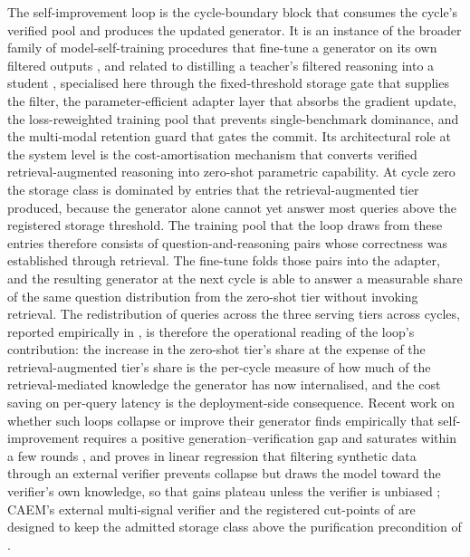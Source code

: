 The self-improvement loop is the cycle-boundary block that consumes the cycle's verified pool and produces the updated generator. It is an instance of the broader family of model-self-training procedures that fine-tune a generator on its own filtered outputs \cite{NEURIPS2022_639a9a17,hosseini2024vstar,gulcehre2023rest}, and related to distilling a teacher's filtered reasoning into a student \cite{ho2023large}, specialised here through the fixed-threshold storage gate that supplies the filter, the parameter-efficient adapter layer that absorbs the gradient update, the loss-reweighted training pool that prevents single-benchmark dominance, and the multi-modal retention guard that gates the commit. Its architectural role at the system level is the cost-amortisation mechanism that converts verified retrieval-augmented reasoning into zero-shot parametric capability. At cycle zero the storage class is dominated by entries that the retrieval-augmented tier produced, because the generator alone cannot yet answer most queries above the registered storage threshold. The training pool that the loop draws from these entries therefore consists of question-and-reasoning pairs whose correctness was established through retrieval. The fine-tune folds those pairs into the adapter, and the resulting generator at the next cycle is able to answer a measurable share of the same question distribution from the zero-shot tier without invoking retrieval. The redistribution of queries across the three serving tiers across cycles, reported empirically in , is therefore the operational reading of the loop's contribution: the increase in the zero-shot tier's share at the expense of the retrieval-augmented tier's share is the per-cycle measure of how much of the retrieval-mediated knowledge the generator has now internalised, and the cost saving on per-query latency is the deployment-side consequence. Recent work on whether such loops collapse or improve their generator finds empirically that self-improvement requires a positive generation--verification gap and saturates within a few rounds \cite{song2024gap}, and proves in linear regression that filtering synthetic data through an external verifier prevents collapse but draws the model toward the verifier's own knowledge, so that gains plateau unless the verifier is unbiased \cite{fu2025collapse}; CAEM's external multi-signal verifier and the registered cut-points of  are designed to keep the admitted storage class above the purification precondition of .


